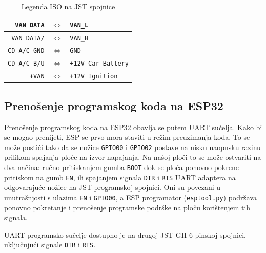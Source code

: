 \begin{table}[H]
    \begin{center}
        \begin{tabular}{|r c l|}
            \hline
            \texttt{VAN DATA} & $\Leftrightarrow$ & \texttt{VAN\_L} \\
            \hline
            \texttt{VAN DATA/} & $\Leftrightarrow$ & \texttt{VAN\_H} \\
            \hline
            \texttt{CD A/C GND} & $\Leftrightarrow$ & \texttt{GND} \\
            \hline
            \texttt{CD A/C B/U} & $\Leftrightarrow$ & \texttt{+12V Car Battery} \\
            \hline
            \texttt{+VAN} & $\Leftrightarrow$ & \texttt{+12V Ignition} \\
            \hline
        \end{tabular}
    \end{center}
    \caption{Legenda ISO na JST spojnice}
    \label{tbl:iso-jst-legend}
\end{table}

\subsection{Prenošenje programskog koda na  ESP32}

Prenošenje programskog koda na ESP32 obavlja se putem UART sučelja. Kako bi se mogao prenijeti, 
ESP se prvo mora staviti u režim preuzimanja koda. 
To se može postići tako da se nožice \texttt{GPIO00} i \texttt{GPIO02} postave na nisku naopnsku razinu prilikom spajanja ploče na izvor napajanja. 
Na našoj ploči to se može ostvariti na dva načina: ručno pritiskanjem gumba \texttt{BOOT} dok se ploča ponovno pokrene pritiskom na gumb \texttt{EN}, 
ili spajanjem signala \texttt{DTR} i \texttt{RTS} UART adaptera na odgovarajuće nožice na JST programskoj spojnici. 
Oni su povezani u unutrašnjosti s ulazima \texttt{EN} i \texttt{GPIO00}, 
a ESP programator (\texttt{esptool.py}) podržava ponovno pokretanje i prenošenje programske podrške na ploču korištenjem tih signala.

\bigskip
\noindent
UART programsko sučelje dostupno je na drugoj JST GH 6-pinskoj spojnici, uključujući signale \texttt{DTR} i \texttt{RTS}.

